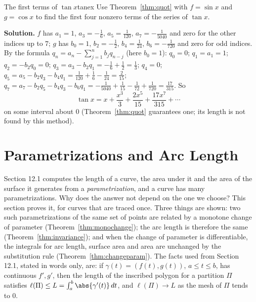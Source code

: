 \documentclass[11pt]{article}
\begin{document}
\begin{exmp}{The first terms of $\tan x$}{tanex}
Use Theorem~\ref{thm:quot} with $f=\sin x$ and $g=\cos x$ to find the first four nonzero terms of the series of $\tan x$.

\textbf{Solution.} $f$ has $a_1=1$, $a_3=-\frac16$, $a_5=\frac1{120}$, $a_7=-\frac1{5040}$ and zero for the other indices up to $7$; $g$ has $b_0=1$, $b_2=-\frac12$, $b_4=\frac1{24}$, $b_6=-\frac1{720}$ and zero for odd indices. By the formula $q_n=a_n-\sum_{j=1}^nb_jq_{n-j}$ (here $b_0=1$): $q_0=0$; $q_1=a_1=1$; $q_2=-b_2q_0=0$; $q_3=a_3-b_2q_1=-\frac16+\frac12=\frac13$; $q_4=0$; $q_5=a_5-b_2q_3-b_4q_1=\frac1{120}+\frac16-\frac1{24}=\frac2{15}$; $q_7=a_7-b_2q_5-b_4q_3-b_6q_1=-\frac1{5040}+\frac1{15}-\frac1{72}+\frac1{720}=\frac{17}{315}$. So
\[
\tan x=x+\frac{x^3}3+\frac{2x^5}{15}+\frac{17x^7}{315}+\cdots
\]
on some interval about $0$ (Theorem~\ref{thm:quot} guarantees one; its length is not found by this method).
\end{exmp}

\section{Parametrizations and Arc Length}

Section 12.1 computes the length of a curve, the area under it and the area of the surface it generates from a \emph{parametrization}, and a curve has many parametrizations. Why does the answer not depend on the one we choose? This section proves it, for curves that are traced once. Three things are shown: two such parametrizations of the same set of points are related by a monotone change of parameter (Theorem~\ref{thm:monochange}); the arc length is therefore the same (Theorem~\ref{thm:invariance}); and when the change of parameter is differentiable, the integrals for arc length, surface area and area are unchanged by the substitution rule (Theorem~\ref{thm:changeparam}). The facts used from Section 12.1, stated in words only, are: if $\gamma(t)=(f(t),g(t))$, $a\le t\le b$, has continuous $f',g'$, then the length of the inscribed polygon for a partition $\Pi$ satisfies $\ell(\Pi)\le L=\int_a^b\abs{\gamma'(t)}\,dt$, and $\ell(\Pi)\to L$ as the mesh of $\Pi$ tends to $0$.
\end{document}
